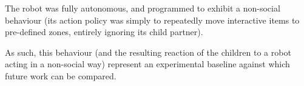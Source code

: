 \documentclass{article}
\begin{document}
The robot was fully autonomous, and programmed to exhibit a non-social behaviour
(its action policy was simply to repeatedly move interactive items to
pre-defined zones, entirely ignoring its child partner).

As such, this behaviour (and the resulting reaction of the children to a
robot acting in a non-social way) represent an experimental baseline against which
future work can be compared.


%
%
%
%
%
%
\end{document}
